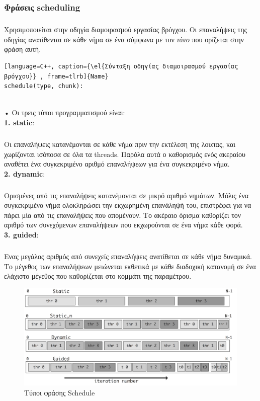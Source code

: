 \documentclass[12pt]{article}
\newcommand{\en}[1]{\foreignlanguage{english}{#1}}
\newcommand{\el}[1]{\selectlanguage{greek}{#1}\selectlanguage{english}}
\begin{document}
\subsubsection{Φράσεις \en{scheduling}}
\subparagraph{}
      Χρησιμοποιείται στην οδηγία διαμοιρασμού εργασίας βρόγχου. Οι επαναλήψεις της οδηγίας ανατίθενται σε κάθε νήμα σε ένα σύμφωνα με τον \emph{τύπο} που ορίζεται στην φράση αυτή.
\begin{lstlisting}[language=C++, caption={\el{Σύνταξη οδηγίας διαμοιρασμού εργασίας βρόγχου}} , frame=tlrb]{Name}
schedule(type, chunk): 
\end{lstlisting}
\ \\
    •  Οι τρεις τύποι προγραμματισμού είναι:\\
      
    \textbf{1. \en{static}}:
    \subparagraph{}

       Οι επαναλήψεις κατανέμονται σε κάθε νήμα πριν την εκτέλεση της λουπας, και χωρίζονται ισόποσα σε όλα τα threads. Παρόλα αυτά ο καθορισμός ενός ακεραίου αναθέτει ένα συγκεκριμένο αριθμό επαναλήψεων για ένα συγκεκριμένο νήμα.\\
       
    \textbf{2. \en{dynamic}}: 
    \subparagraph{}
       Ορισμένες από τις επαναλήψεις κατανέμονται σε μικρό αριθμό νημάτων. Μόλις ένα συγκεκριμένο νήμα ολοκληρώσει την εκχωρημένη επανάληψή του, επιστρέφει για να πάρει μία από τις επαναλήψεις που απομένουν. Το ακέραιο όρισμα καθορίζει τον αριθμό των συνεχόμενων επαναλήψεων που εκχωρούνται σε ένα νήμα κάθε φορά.\\
\clearpage
    \textbf{3. \en{guided}}: 
    \subparagraph{}
       Ενας μεγάλος αριθμός από συνεχείς επαναλήψεις ανατίθεται σε κάθε νήμα δυναμικά. Το μέγεθος των επαναλήψεων μειώνεται εκθετικά με κάθε διαδοχική κατανομή σε ένα ελάχιστο μέγεθος που καθορίζεται στο κομμάτι της παραμέτρου.\\
       
       
       \begin{figure}[h]
\includegraphics[width=\textwidth]{schedules}
\centering
\captionsetup{justification=centering, singlelinecheck=false}
	\caption{Τύποι φράσης \en{Schedule}}
\label{fig:schedules}
\end{figure}
\end{document}
